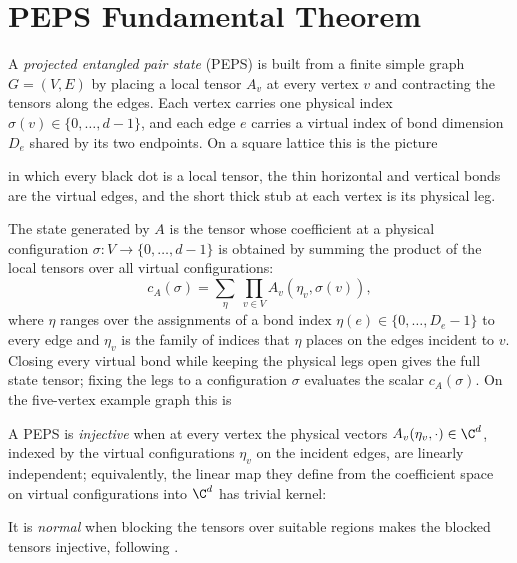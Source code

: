
\chapter{PEPS Fundamental Theorem}%
\label{ch:peps_ft}

A \emph{projected entangled pair state} (PEPS) is built from a finite simple
graph $G=(V,E)$ by placing a local tensor $A_v$ at every vertex $v$ and
contracting the tensors along the edges. Each vertex carries one physical index
$\sigma(v)\in\{0,\ldots,d-1\}$, and each edge $e$ carries a virtual index of
bond dimension $D_e$ shared by its two endpoints. On a square lattice this is
the picture
\begin{center}
    \TNPEPSLatticeState
\end{center}
in which every black dot is a local tensor, the thin horizontal and vertical
bonds are the virtual edges, and the short thick stub at each vertex is its
physical leg.

The state generated by $A$ is the tensor whose coefficient at a physical
configuration $\sigma\colon V\to\{0,\ldots,d-1\}$ is obtained by summing the
product of the local tensors over all virtual configurations:
\[
    c_A(\sigma)=\sum_{\eta}\ \prod_{v\in V} A_v(\eta_v,\sigma(v)),
\]
where $\eta$ ranges over the assignments of a bond index $\eta(e)\in\{0,\ldots,
D_e-1\}$ to every edge and $\eta_v$ is the family of indices that $\eta$ places
on the edges incident to $v$. Closing every virtual bond while keeping the
physical legs open gives the full state tensor; fixing the legs to a
configuration $\sigma$ evaluates the scalar $c_A(\sigma)$. On the five-vertex
example graph this is
\begin{center}
    \TNPEPSStateContraction
\end{center}

A PEPS is \emph{injective} when at every vertex the physical vectors
$A_v(\eta_v,\cdot)\in\C^d$, indexed by the virtual configurations $\eta_v$ on
the incident edges, are linearly independent; equivalently, the linear map they
define from the coefficient space on virtual configurations into $\C^d$ has
trivial kernel:
\begin{center}
    \TNPEPSVertexInjectivityMap
\end{center}
It is \emph{normal} when blocking the tensors over suitable regions makes the
blocked tensors injective, following
\cite[Section~4, lines~1316--1318]{Molnar2018NormalPEPS}.

